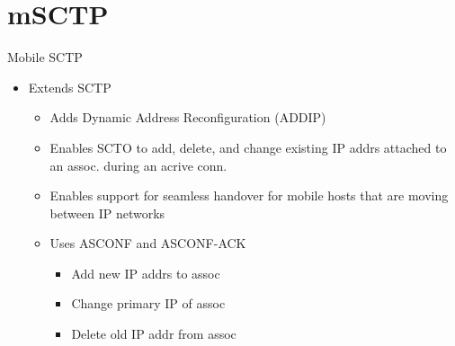 \documentclass[a4paper]{article}
\begin{document}
\section{mSCTP}
Mobile SCTP
\begin{itemize}
	\item Extends SCTP
	\begin{itemize}
		\item Adds Dynamic Address Reconfiguration (ADDIP)
		\item Enables SCTO to add, delete, and change existing IP addrs
			attached to an assoc. during an acrive conn.
		\item Enables support for seamless handover for mobile hosts
			that are moving between IP networks
		\item Uses ASCONF and ASCONF-ACK
		\begin{itemize}
			\item Add new IP addrs to assoc
			\item Change primary IP of assoc
			\item Delete old IP addr from assoc
		\end{itemize}
	\end{itemize}
\end{itemize}
\end{document}
